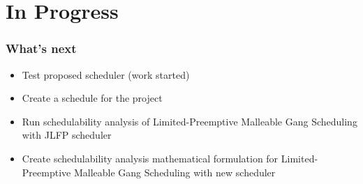\documentclass[pdf]{beamer}
\begin{document}
\section{In Progress}

\begin{frame}
    \frametitle{What's next}

    \begin{itemize}
        \item Test proposed scheduler (work started)
        \item Create a schedule for the project
        \item Run schedulability analysis of Limited-Preemptive Malleable Gang Scheduling with JLFP scheduler
        \item Create schedulability analysis mathematical formulation for Limited-Preemptive Malleable Gang Scheduling with new scheduler
    \end{itemize}
    
\end{frame}
\end{document}
